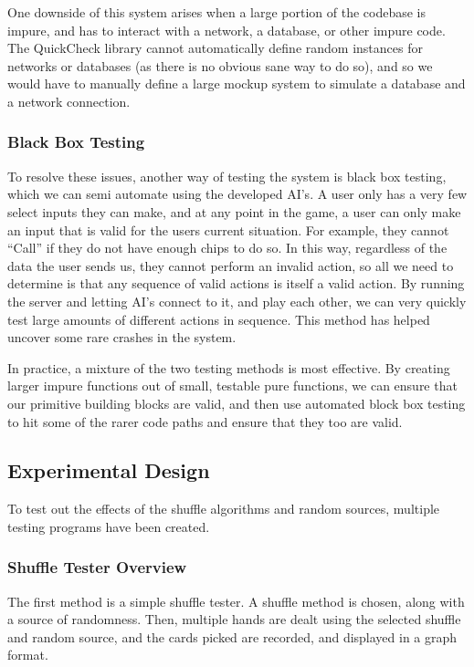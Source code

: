 One downside of this system arises when a large portion of the codebase is
impure, and has to interact with a network, a database, or other impure code.
The QuickCheck library cannot automatically define random instances for
networks or databases (as there is no obvious sane way to do so), and so we
would have to manually define a large mockup system to simulate a database
and a network connection.

\subsubsection{Black Box Testing}

To resolve these issues, another way of testing the system is black box
testing, which we can semi automate using the developed AI's. A user only
has a very few select inputs they can make, and at any point in the game,
a user can only make an input that is valid for the users current situation.
For example, they cannot ``Call'' if they do not have enough chips to do so.
In this way, regardless of the data the user sends us, they cannot perform
an invalid action, so all we need to determine is that any sequence of valid
actions is itself a valid action. By running the server and letting AI's
connect to it, and play each other, we can very quickly test large amounts
of different actions in sequence. This method has helped uncover some rare
crashes in the system.

In practice, a mixture of the two testing methods is most effective. By
creating larger impure functions out of small, testable pure functions, we
can ensure that our primitive building blocks are valid, and then use automated
block box testing to hit some of the rarer code paths and ensure that they
too are valid.

\subsection{Experimental Design}\label{section:experimentaldesign}
To test out the effects of the shuffle algorithms and random sources, multiple
testing programs have been created.

\subsubsection{Shuffle Tester Overview}\label{section:shuffletesteroverview}

The first method is a simple shuffle
tester. A shuffle method is chosen, along with a source of randomness. Then,
multiple hands are dealt using the selected shuffle and random source, and
the cards picked are recorded, and displayed in a graph format.

